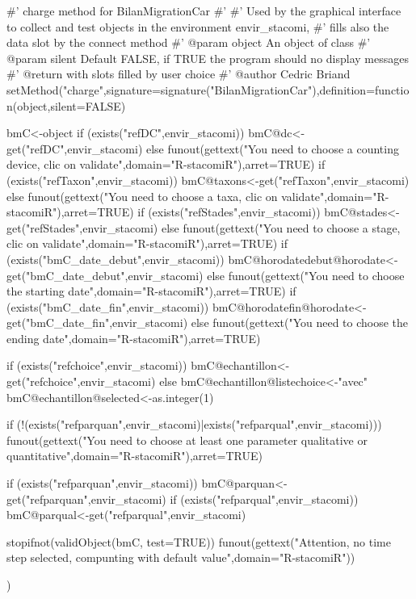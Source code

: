 #' charge method for BilanMigrationCar
#' 
#' Used by the graphical interface to collect and test objects in the environment envir_stacomi, 
#' fills also the data slot by the connect method
#' @param object An object of class 
#' @param silent Default FALSE, if TRUE the program should no display messages
#' @return  with slots filled by user choice
#' @author Cedric Briand 
setMethod("charge",signature=signature("BilanMigrationCar"),definition=function(object,silent=FALSE){ 
			bmC<-object  
			if (exists("refDC",envir_stacomi)) {
				bmC@dc<-get("refDC",envir_stacomi)
			} else {
				funout(gettext("You need to choose a counting device, clic on validate\n",domain="R-stacomiR"),arret=TRUE)
			}
			if (exists("refTaxon",envir_stacomi)) {
				bmC@taxons<-get("refTaxon",envir_stacomi)
			} else {      
				funout(gettext("You need to choose a taxa, clic on validate\n",domain="R-stacomiR"),arret=TRUE)
			}
			if (exists("refStades",envir_stacomi)){
				bmC@stades<-get("refStades",envir_stacomi)
			} else 
			{
				funout(gettext("You need to choose a stage, clic on validate\n",domain="R-stacomiR"),arret=TRUE)
			}
			if (exists("bmC_date_debut",envir_stacomi)) {
				bmC@horodatedebut@horodate<-get("bmC_date_debut",envir_stacomi)
			} else {
				funout(gettext("You need to choose the starting date\n",domain="R-stacomiR"),arret=TRUE)
			}
			if (exists("bmC_date_fin",envir_stacomi)) {
				bmC@horodatefin@horodate<-get("bmC_date_fin",envir_stacomi)
			} else {
				funout(gettext("You need to choose the ending date\n",domain="R-stacomiR"),arret=TRUE)
			}  
			
			if (exists("refchoice",envir_stacomi)){
				bmC@echantillon<-get("refchoice",envir_stacomi)
			} else 
			{
				bmC@echantillon@listechoice<-"avec"
				bmC@echantillon@selected<-as.integer(1)
			}
			
			if (!(exists("refparquan",envir_stacomi)|exists("refparqual",envir_stacomi))){
				funout(gettext("You need to choose at least one parameter qualitative or quantitative\n",domain="R-stacomiR"),arret=TRUE)	
			}
			
			if (exists("refparquan",envir_stacomi)){
				bmC@parquan<-get("refparquan",envir_stacomi)
			} 
			if (exists("refparqual",envir_stacomi)){
				bmC@parqual<-get("refparqual",envir_stacomi)
			} 
						
			stopifnot(validObject(bmC, test=TRUE))
			funout(gettext("Attention, no time step selected, compunting with default value\n",domain="R-stacomiR"))
			
		})

